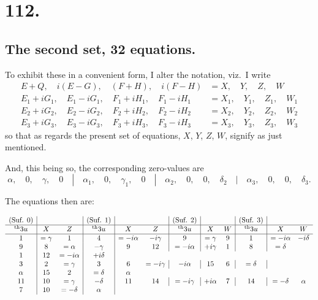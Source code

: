 \documentclass[11pt,a4paper]{book}
\providecommand{\uth}{\textsuperscript{th}}
\begin{document}
\newpage
\section*{112.}
\label{sec:112}

\subsection*{The second set, 32 equations.}

To exhibit these in a convenient form, I alter the notation, viz.\ I write
\begin{align*}
E+Q, \quad i(E-G), \quad (F+H), \quad i(F-H) &= X, \quad Y, \quad Z, \quad W \\
E_1+iG_1, \quad E_1-iG_1, \quad F_1+iH_1, \quad F_1-iH_1 &= X_1, \quad Y_1, \quad Z_1, \quad W_1 \\
E_2+iG_2, \quad E_2-iG_2, \quad F_2+iH_2, \quad F_2-iH_2 &= X_2, \quad Y_2, \quad Z_2, \quad W_2 \\
E_3+iG_3, \quad E_3-iG_3, \quad F_3+iH_3, \quad F_3-iH_3 &= X_3, \quad Y_3, \quad Z_3, \quad W_3
\end{align*}
so that as regards the present set of equations, $X$, $Y$, $Z$, $W$, signify as just mentioned.

And, this being so, the corresponding zero-values are
\[
\alpha, \quad 0, \quad \gamma, \quad 0 \quad|\quad \alpha_1, \quad 0, \quad \gamma_1, \quad 0 \quad|\quad \alpha_2, \quad 0, \quad 0, \quad \delta_2 \quad|\quad \alpha_3, \quad 0, \quad 0, \quad \delta_3.
\]

The equations then are:

\[
\begin{array}{c|cc|c|cc|c|cc|c|cc}
\text{(Suf. 0)} & & & \text{(Suf. 1)} & & & \text{(Suf. 2)} & & & \text{(Suf. 3)} & & \\
\hline
\uth{3}u & X & Z & \uth{3}u & X & Z & \uth{3}u & X & W & \uth{3}u & X & W \\
\hline
1 & = \gamma & 1 & 4 & = -i\alpha & -i\gamma & 9 & = \gamma & 9 & 1 & = -i\alpha & -i\delta \\
9 & 8 & = \alpha & -\gamma & 9 & 12 & = -i\alpha & +i\gamma & 1 & 8 & = \delta \\
1 & 12 & = -i\alpha & +i\delta \\
3 & 2 & = \gamma & 3 & 6 & = -i\gamma & -i\alpha & 15 & 6 & = \delta \\
\alpha & 15 & 2 & = \delta & \alpha \\
11 & 10 & = \gamma & -\delta & 11 & 14 & = -i\gamma & +i\alpha & 7 & 14 & = -\delta & \alpha \\
7 & 10 & = -\delta & \alpha
\end{array}
\]
\end{document}
